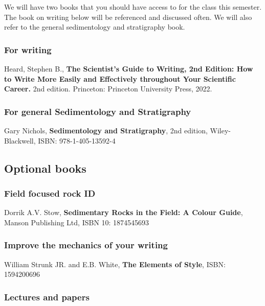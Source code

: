 \documentclass[11pt,]{article}
\begin{document}
We will have two books that you should have access to for the class this
semester. The book on writing below will be referenced and discussed
often. We will also refer to the general sedimentology and stratigraphy
book.

\hypertarget{for-writing}{%
\subsubsection{For writing}\label{for-writing}}

Heard, Stephen B., \textbf{The Scientist's Guide to Writing, 2nd
Edition: How to Write More Easily and Effectively throughout Your
Scientific Career.} 2nd edition. Princeton: Princeton University Press,
2022.

\hypertarget{for-general-sedimentology-and-stratigraphy}{%
\subsubsection{For general Sedimentology and
Stratigraphy}\label{for-general-sedimentology-and-stratigraphy}}

Gary Nichols, \textbf{Sedimentology and Stratigraphy}, 2nd edition,
Wiley-Blackwell, ISBN: 978-1-405-13592-4

\hypertarget{optional-books}{%
\subsection{Optional books}\label{optional-books}}

\hypertarget{field-focused-rock-id}{%
\subsubsection{Field focused rock ID}\label{field-focused-rock-id}}

Dorrik A.V. Stow, \textbf{Sedimentary Rocks in the Field: A Colour
Guide}, Manson Publishing Ltd, ISBN 10: 1874545693

\hypertarget{improve-the-mechanics-of-your-writing}{%
\subsubsection{Improve the mechanics of your
writing}\label{improve-the-mechanics-of-your-writing}}

William Strunk JR. and E.B. White, \textbf{The Elements of Style}, ISBN:
1594200696

\hypertarget{lectures-and-papers}{%
\subsubsection{Lectures and papers}\label{lectures-and-papers}}
\end{document}
